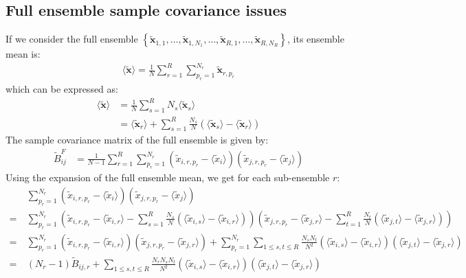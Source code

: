 \documentclass[12pt]{scrartcl}
\begin{document}
\subsection{Full ensemble sample covariance issues}
If we consider the full ensemble $\left\{\widetilde{\mathbf{x}}_{1,1},\dots,\widetilde{\mathbf{x}}_{1,N_1},\dots, \widetilde{\mathbf{x}}_{R,1},\dots,\widetilde{\mathbf{x}}_{R,N_R}\right\}$, its ensemble mean is:
\begin{align}
\langle \widetilde{\mathbf{x}} \rangle = \frac{1}{N} \sum_{r=1}^R \sum_{p_r=1}^{N_r} \widetilde{\mathbf{x}}_{r,p_r}
\end{align}
which can be expressed as:
\begin{align}
\langle \widetilde{\mathbf{x}} \rangle & = \frac{1}{N} \sum_{s=1}^R N_s \langle \widetilde{\mathbf{x}}_s \rangle \nonumber \\
 & = \langle \widetilde{\mathbf{x}}_r \rangle + \sum_{s=1}^R \frac{N_s}{N} \left(\langle \widetilde{\mathbf{x}}_s \rangle - \langle \widetilde{\mathbf{x}}_r \rangle \right)
\end{align}
The sample covariance matrix of the full ensemble is given by:
\begin{align}
\label{eq:cov_estim_full}
\widetilde{B}^F_{ij} & = \frac{1}{N-1} \sum_{r=1}^R \sum_{p_r=1}^{N_r} \left(\widetilde{x}_{i,r,p_r} - \langle \widetilde{x}_{i} \rangle\right) \left(\widetilde{x}_{j,r,p_r} - \langle \widetilde{x}_{j} \rangle\right)
\end{align}
Using the expansion of the full ensemble mean, we get for each sub-ensemble $r$:
\begin{align}
& \sum_{p_r=1}^{N_r} \left(\widetilde{x}_{i,r,p_r} - \langle \widetilde{x}_{i} \rangle\right) \left(\widetilde{x}_{j,r,p_r} - \langle \widetilde{x}_{j} \rangle\right) \nonumber \\
= \ & \sum_{p_r=1}^{N_r} \left(\widetilde{x}_{i,r,p_r} - \langle \widetilde{x}_{i,r} \rangle - \sum_{s=1}^R \frac{N_s}{N} \left(\langle \widetilde{x}_{i,s} \rangle - \langle \widetilde{x}_{i,r} \rangle \right) \right)  \left(\widetilde{x}_{j,r,p_r} - \langle \widetilde{x}_{j,r} \rangle - \sum_{t=1}^R \frac{N_t}{N} \left(\langle \widetilde{x}_{j,t} \rangle - \langle \widetilde{x}_{j,r} \rangle \right) \right) \nonumber \\
= \ & \sum_{p_r=1}^{N_r} \left(\widetilde{x}_{i,r,p_r} - \langle \widetilde{x}_{i,r} \rangle \right) \left(\widetilde{x}_{j,r,p_r} - \langle \widetilde{x}_{j,r} \rangle \right) + \sum_{p_r=1}^{N_r} \sum_{1 \le s,t \le R} \frac{N_s N_t}{N^2} \left(\langle \widetilde{x}_{i,s} \rangle - \langle \widetilde{x}_{i,r} \rangle \right) \left(\langle \widetilde{x}_{j,t} \rangle - \langle \widetilde{x}_{j,r} \rangle \right) \nonumber \\
= \ & \left(N_r-1\right) \widetilde{B}_{ij,r} + \sum_{1 \le s,t \le R} \frac{N_r N_s N_t}{N^2} \left(\langle \widetilde{x}_{i,s} \rangle - \langle \widetilde{x}_{i,r} \rangle \right) \left(\langle \widetilde{x}_{j,t} \rangle - \langle \widetilde{x}_{j,r} \rangle \right)
\end{align}
\end{document}
